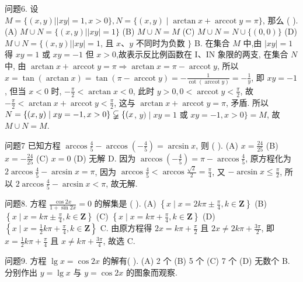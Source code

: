 问题6. 设 $M=\{(x, y)|| x y \mid=1, x>0\}, N=\{(x, y) \mid \arctan x+ \operatorname{arccot} y=\pi\}$, 那么 ( ).
(A) $M \cup N=\{(x, y)|| x y \mid=1\}$
(B) $M \cup N=M$
(C) $M \cup N=N \cup\{(0,0)\}$
(D) $M \cup N=\{(x, y)|| x y \mid=1$, 且 $x 、 y$ 不同时为负数 $\}$
B. 在集合 $M$ 中,由 $|x y|=1$ 得 $x y=1$ 或 $x y=-1$ 但 $x>0$,故表示反比例函数在 $\mathrm{I} 、 \mathrm{IN}$ 象限的两支, 在集合 $N$ 中, 由 $\arctan x+\operatorname{arccot} y= \pi \Rightarrow \arctan x=\pi-\operatorname{arccot} y$, 所以 $x=\tan (\arctan x)=\tan (\pi-\operatorname{arccot} y)= -\frac{1}{\cot (\operatorname{arccot} y)}=-\frac{1}{y}$, 即 $x y=-1$, 但当 $x<0$ 时, $-\frac{\pi}{2}<\arctan x<0$, 此时 $y>0,0<\operatorname{arccot} y<\frac{\pi}{2}$, 故 $-\frac{\pi}{2}<\arctan x+\operatorname{arccot} y<\frac{\pi}{2}$, 这与
$\arctan x+\operatorname{arccot} y=\pi$, 矛盾.
所以 $N=\{(x, y) \mid x y=-1, x>0\} \varsubsetneqq\{(x$, $y) \mid x y=1$ 或 $x y=-1, x>0\}=M$, 故 $M \cup N=M$.



问题7 已知方程 $\arccos \frac{4}{5}-\arccos \left(-\frac{4}{5}\right)=\arcsin x$, 则 ( ).
(A) $x=\frac{24}{25}$
(B) $x=-\frac{24}{25}$
(C) $x=0$
(D) 无解
D. 因为 $\arccos \left(-\frac{4}{5}\right)=\pi-\arccos \frac{4}{5}$, 原方程化为 $2 \arccos \frac{4}{5}- \arcsin x=\pi$, 因为 $\arccos \frac{4}{5}<\arccos \frac{\sqrt{2}}{2}=\frac{\pi}{4}$, 又 $-\arcsin x \leqslant \frac{\pi}{2}$, 所以 $2 \arccos \frac{4}{5}-\arcsin x<\pi$, 故无解.



问题8. 方程 $\frac{\cos 2 x}{1+\sin 2 x}=0$ 的解集是 ( ).
(A) $\left\{x \mid x=2 k \pi \pm \frac{\pi}{4}, k \in \mathbf{Z}\right\}$
(B) $\left\{x \mid x=k \pi \pm \frac{\pi}{4}, k \in \mathbf{Z}\right\}$
(C) $\left\{x \mid x=k \pi+\frac{\pi}{4}, k \in \mathbf{Z}\right\}$
(D) $\left\{x \mid x=\frac{1}{2} k \pi+\frac{\pi}{4}, k \in \mathbf{Z}\right\}$
C. 由原方程得 $2 x=k \pi+\frac{\pi}{2}$ 且 $2 x \neq 2 k \pi+\frac{3 \pi}{2}$, 即 $x=\frac{1}{2} k \pi+\frac{\pi}{4}$ 且 $x \neq k \pi+\frac{3 \pi}{4}$, 故选 C.



问题9. 方程 $\lg x=\cos 2 x$ 的解有( ).
(A) 2 个
(B) 5 个
(C) 7 个
(D) 无数个
B. 分别作出 $y=\lg x$ 与 $y=\cos 2 x$ 的图象而观察.




